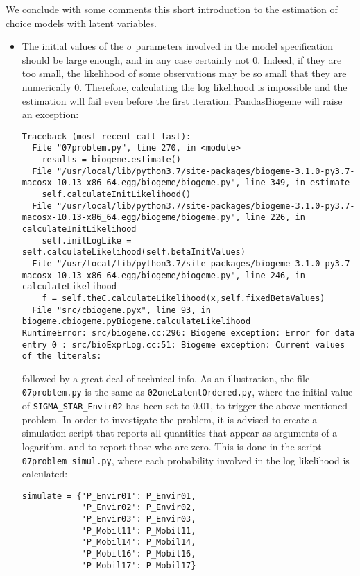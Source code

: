 \documentclass[12pt,a4paper]{article}
\begin{document}
We conclude with some comments this short introduction to the estimation of choice models
with latent variables.
\begin{itemize}
\item The initial values of the $\sigma$ parameters involved in the
  model specification should be large enough, and in any case
  certainly not 0. Indeed, if they are too
  small, the likelihood of some observations may be so small that they
  are numerically 0. Therefore, calculating the log likelihood is
  impossible and the estimation will fail even before the first
  iteration. PandasBiogeme will raise an exception:
  \begin{lstlisting}
Traceback (most recent call last):
  File "07problem.py", line 270, in <module>
    results = biogeme.estimate()
  File "/usr/local/lib/python3.7/site-packages/biogeme-3.1.0-py3.7-macosx-10.13-x86_64.egg/biogeme/biogeme.py", line 349, in estimate
    self.calculateInitLikelihood()
  File "/usr/local/lib/python3.7/site-packages/biogeme-3.1.0-py3.7-macosx-10.13-x86_64.egg/biogeme/biogeme.py", line 226, in calculateInitLikelihood
    self.initLogLike = self.calculateLikelihood(self.betaInitValues)
  File "/usr/local/lib/python3.7/site-packages/biogeme-3.1.0-py3.7-macosx-10.13-x86_64.egg/biogeme/biogeme.py", line 246, in calculateLikelihood
    f = self.theC.calculateLikelihood(x,self.fixedBetaValues)
  File "src/cbiogeme.pyx", line 93, in biogeme.cbiogeme.pyBiogeme.calculateLikelihood
RuntimeError: src/biogeme.cc:296: Biogeme exception: Error for data entry 0 : src/bioExprLog.cc:51: Biogeme exception: Current values of the literals:
  \end{lstlisting}
  followed by a great deal of technical info. As an illustration, the
  file \lstinline+07problem.py+ is the same as
  \lstinline+02oneLatentOrdered.py+, where the initial value of
  \lstinline+SIGMA_STAR_Envir02+ has been set to 0.01, to trigger the
  above mentioned problem. In order to investigate the problem, it is
  advised to create a simulation script that reports all quantities
  that appear as arguments of a logarithm, and to report those who are
  zero. This is done in the script \lstinline+07problem_simul.py+,
  where each probability involved in the log likelihood is calculated:
  \begin{lstlisting}
simulate = {'P_Envir01': P_Envir01,
            'P_Envir02': P_Envir02,
            'P_Envir03': P_Envir03,
            'P_Mobil11': P_Mobil11,
            'P_Mobil14': P_Mobil14,
            'P_Mobil16': P_Mobil16,
            'P_Mobil17': P_Mobil17}


\end{lstlisting}
\end{itemize}
\end{document}
